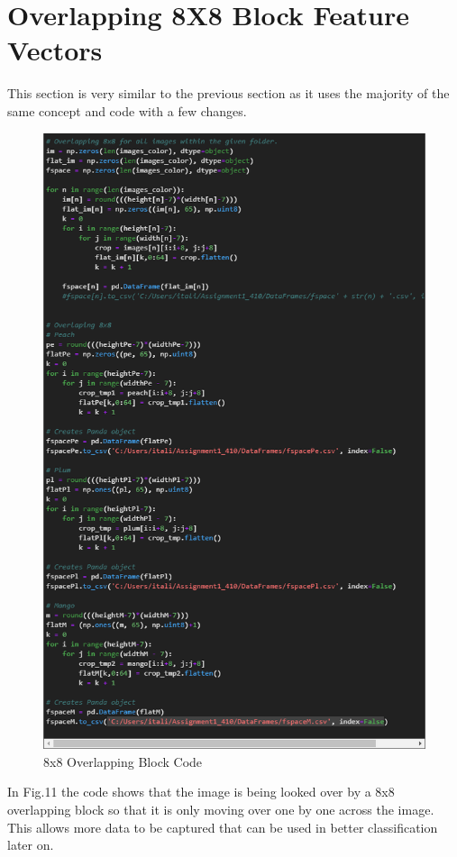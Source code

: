 \documentclass[conference]{IEEEtran}
\begin{document}
\section{Overlapping 8X8 Block Feature Vectors}
This section is very similar to the previous section as it uses the majority of the same concept and code with a few changes.

\begin{figure}[h]
  \centering
  \includegraphics[width=\linewidth]{8x8ov.png}
  \caption{8x8 Overlapping Block Code}
\end{figure}
In Fig.11 the code shows that the image is being looked over by a 8x8 overlapping block so that it is only moving over one by one across the image. This allows more data to be captured that can be used in better classification later on.
\end{document}
